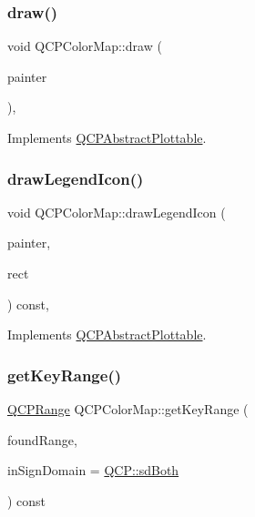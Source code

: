 \subsubsection{\texorpdfstring{draw()}{draw()}}
{\footnotesize\ttfamily void Q\+C\+P\+Color\+Map\+::draw (\begin{DoxyParamCaption}\item[{\mbox{\hyperlink{class_q_c_p_painter}{Q\+C\+P\+Painter}} $\ast$}]{painter }\end{DoxyParamCaption})\hspace{0.3cm}{\ttfamily [protected]}, {\ttfamily [virtual]}}



Implements \mbox{\hyperlink{class_q_c_p_abstract_plottable_a453f676a5cee7bf846c5f0fa05ea84b3}{Q\+C\+P\+Abstract\+Plottable}}.

\mbox{\label{class_q_c_p_color_map_adeaa5e262a03b7f021bd1aa6f1e60ce9}} 
\subsubsection{\texorpdfstring{drawLegendIcon()}{drawLegendIcon()}}
{\footnotesize\ttfamily void Q\+C\+P\+Color\+Map\+::draw\+Legend\+Icon (\begin{DoxyParamCaption}\item[{\mbox{\hyperlink{class_q_c_p_painter}{Q\+C\+P\+Painter}} $\ast$}]{painter,  }\item[{const Q\+RectF \&}]{rect }\end{DoxyParamCaption}) const\hspace{0.3cm}{\ttfamily [protected]}, {\ttfamily [virtual]}}



Implements \mbox{\hyperlink{class_q_c_p_abstract_plottable_a9a450783fd9ed539e589999fd390cdf7}{Q\+C\+P\+Abstract\+Plottable}}.

\mbox{\label{class_q_c_p_color_map_a985861974560f950af6cb7fae8c46267}} 
\subsubsection{\texorpdfstring{getKeyRange()}{getKeyRange()}}
{\footnotesize\ttfamily \mbox{\hyperlink{class_q_c_p_range}{Q\+C\+P\+Range}} Q\+C\+P\+Color\+Map\+::get\+Key\+Range (\begin{DoxyParamCaption}\item[{bool \&}]{found\+Range,  }\item[{\mbox{\hyperlink{namespace_q_c_p_afd50e7cf431af385614987d8553ff8a9}{Q\+C\+P\+::\+Sign\+Domain}}}]{in\+Sign\+Domain = {\ttfamily \mbox{\hyperlink{namespace_q_c_p_afd50e7cf431af385614987d8553ff8a9aa38352ef02d51ddfa4399d9551566e24}{Q\+C\+P\+::sd\+Both}}} }\end{DoxyParamCaption}) const\hspace{0.3cm}{\ttfamily [virtual]}}

